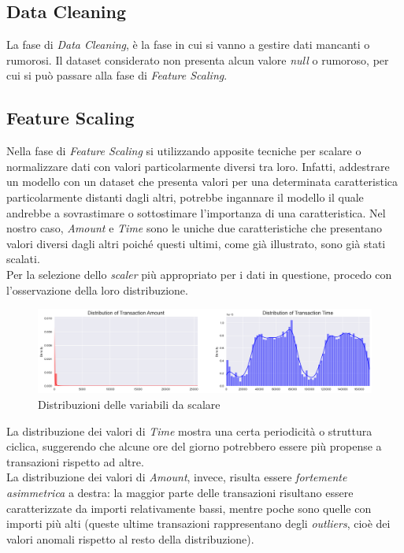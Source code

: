\documentclass[]{article}
\begin{document}
    \subsection{Data Cleaning}
        La fase di \textit{Data Cleaning}, è la fase in cui si vanno a gestire dati mancanti o rumorosi.
        Il dataset considerato non presenta alcun valore \textit{null} o rumoroso, per cui si può passare alla fase di \textit{Feature Scaling}.

    \subsection{Feature Scaling}
        Nella fase di \textit{Feature Scaling} si utilizzando apposite tecniche per scalare o normalizzare dati con valori particolarmente diversi tra loro. Infatti, addestrare un modello con un dataset che presenta valori per una determinata caratteristica particolarmente distanti dagli altri, potrebbe ingannare il modello il quale andrebbe a sovrastimare o sottostimare l'importanza di una caratteristica. Nel nostro caso, \textit{Amount} e \textit{Time} sono le uniche due caratteristiche che presentano valori diversi dagli altri poiché questi ultimi, come già illustrato, sono già stati scalati.\\
        Per la selezione dello \textit{scaler} più appropriato per i dati in questione, procedo con l'osservazione della loro distribuzione.
        \begin{figure}[H]
            \centering
            \includegraphics[width=.9\textwidth]{img/valuesDistribution.png}
            \caption[short]{Distribuzioni delle variabili da scalare}
        \end{figure}
        La distribuzione dei valori di \textit{Time} mostra una certa periodicità o struttura ciclica, suggerendo che alcune ore del giorno potrebbero essere più propense a transazioni rispetto ad altre.\\
        La distribuzione dei valori di \textit{Amount}, invece, risulta essere \textit{fortemente asimmetrica} a destra: la maggior parte delle transazioni risultano essere caratterizzate da importi relativamente bassi, mentre poche sono quelle con importi più alti (queste ultime transazioni rappresentano degli \textit{outliers}, cioè dei valori anomali rispetto al resto della distribuzione).\\
\end{document}

